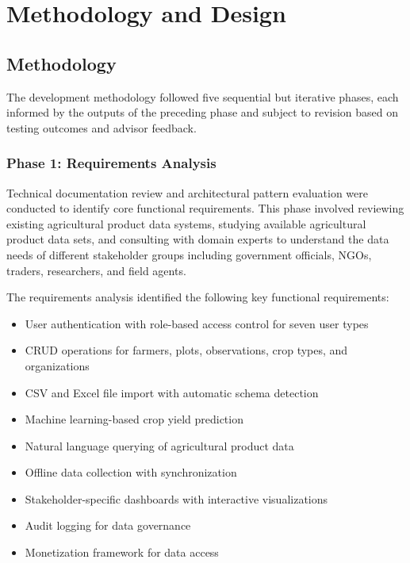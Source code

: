 
\chapter{Methodology and Design}

\section{Methodology}

The development methodology followed five sequential but iterative phases, each informed by the outputs of the preceding phase and subject to revision based on testing outcomes and advisor feedback.

\subsection{Phase 1: Requirements Analysis}

Technical documentation review and architectural pattern evaluation were conducted to identify core functional requirements. This phase involved reviewing existing agricultural product data systems, studying available agricultural product data sets, and consulting with domain experts to understand the data needs of different stakeholder groups including government officials, NGOs, traders, researchers, and field agents.

The requirements analysis identified the following key functional requirements:
\begin{itemize}
  \item User authentication with role-based access control for seven user types
  \item CRUD operations for farmers, plots, observations, crop types, and organizations
  \item CSV and Excel file import with automatic schema detection
  \item Machine learning-based crop yield prediction
  \item Natural language querying of agricultural product data 
  \item Offline data collection with synchronization
  \item Stakeholder-specific dashboards with interactive visualizations
  \item Audit logging for data governance
  \item Monetization framework for data access
\end{itemize}

